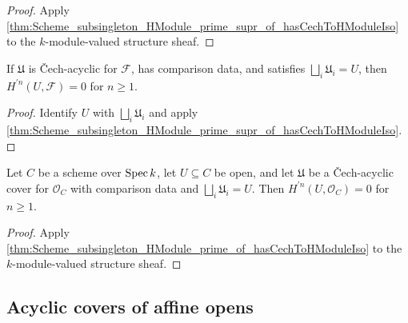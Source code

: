 \begin{proof}


\leanok
  Apply \cref{thm:Scheme_subsingleton_HModule_prime_supr_of_hasCechToHModuleIso} to the \(k\)-module-valued structure sheaf.
\end{proof}

\begin{theorem}\leanok
  \label{thm:Scheme_subsingleton_HModule_prime_of_hasCechToHModuleIso}

  If \(\mathfrak U\) is \v{C}ech-acyclic for \(\mathcal F\), has comparison data, and satisfies \(\bigsqcup_i\mathfrak U_i=U\), then \(H^{\prime n}(U,\mathcal F)=0\) for \(n\geq1\).
\end{theorem}

\begin{proof}


\leanok
  Identify \(U\) with \(\bigsqcup_i\mathfrak U_i\) and apply \cref{thm:Scheme_subsingleton_HModule_prime_supr_of_hasCechToHModuleIso}.
\end{proof}

\begin{theorem}\leanok
  \label{thm:Scheme_subsingleton_HModule_prime_of_hasCechToHModuleIso_curve}

  Let \(C\) be a scheme over \(\operatorname{Spec} k\), let \(U\subseteq C\) be open, and let \(\mathfrak U\) be a \v{C}ech-acyclic cover for \(\mathcal O_C\) with comparison data and \(\bigsqcup_i\mathfrak U_i=U\). Then \(H^{\prime n}(U,\mathcal O_C)=0\) for \(n\geq1\).
\end{theorem}

\begin{proof}


\leanok
  Apply \cref{thm:Scheme_subsingleton_HModule_prime_of_hasCechToHModuleIso} to the \(k\)-module-valued structure sheaf.
\end{proof}

\subsection{Acyclic covers of affine opens}

